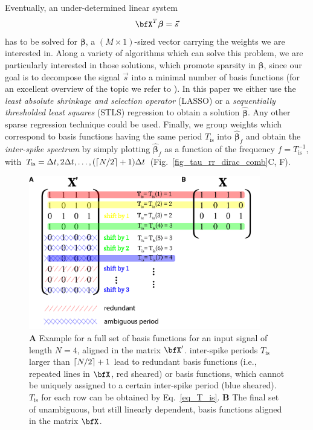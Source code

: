 \documentclass[entropy,article,submit,pdftex,moreauthors]{Definitions/mdpi}
\DeclarePairedDelimiter\ceil{\lceil}{\rceil}
\begin{document}
\noindent Eventually, an under-determined linear system
\begin{equation}
\bfX^T \boldsymbol{\beta}=\vec{s}
\label{eq_linear_system}
\end{equation}  
has to be solved for $\boldsymbol\beta$, a $(M\times 1)$-sized vector carrying the weights we are interested in. Along a variety of algorithms which can solve this problem, we are 
particularly interested in those solutions, which promote sparsity in $\boldsymbol\beta$, since our goal is to decompose the signal $\vec{s}$ into a minimal number of basis 
functions (for an excellent overview of the topic we refer to \citet{Brunton2019}). In this paper we either use the \textit{least absolute shrinkage and selection operator} 
(LASSO) \cite{Tibshirani1996} or a \textit{sequentially thresholded least squares} (STLS) regression \cite{Brunton2016,Brunton2019} to obtain a solution $\hat{\boldsymbol\beta}$. Any other 
sparse regression technique could be used. Finally, we group weights 
which correspond to basis functions having the same period 
$T_\text{is}$ into $\hat{\boldsymbol\beta}_f$ and obtain the 
\textit{inter-spike spectrum} by simply plotting $\hat{\boldsymbol\beta}_f$ as a function of the frequency $f=T_\text{is}^{-1}$, with $T_\text{is}=\Delta t, 2\Delta t, \dots, (\ceil*{N/2}+1) \Delta t$ 
(Fig.~\ref{fig_tau_rr_dirac_comb}C, F).

\begin{figure}
\centering
\includegraphics[width=0.9\textwidth]{./figures/fig_tau_rr_basis_functions}
\caption{\textbf{A} Example for a full set of basis functions for an input signal of length $N=4$, aligned in the matrix $\bfX'$. inter-spike periods $T_{\text{is}}$ larger 
than $\ceil*{N/2}+1$ lead to redundant basis functions (i.e., repeated lines in $\bfX$, red sheared) or basis functions, which cannot be uniquely assigned to a certain inter-spike period 
(blue sheared). $T_{\text{is}}$ for each row can be obtained by Eq.~\eqref{eq_T_is}. \textbf{B} The final set of unambiguous, but still linearly dependent, basis functions aligned in the matrix $\bfX$.} \label{fig_tau_rr_basis_functions}
\end{figure}
\end{document}
